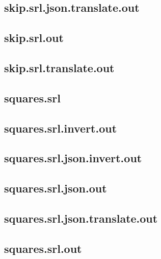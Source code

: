 \subsection{skip.srl.json.translate.out}
\label{app:skip_srl.json.translate.out}

\subsection{skip.srl.out}
\label{app:skip_srl.out}

\subsection{skip.srl.translate.out}
\label{app:skip_srl.translate.out}

\subsection{squares.srl}
\label{app:squares_srl}

\subsection{squares.srl.invert.out}
\label{app:squares_srl.invert.out}

\subsection{squares.srl.json.invert.out}
\label{app:squares_srl.json.invert.out}

\subsection{squares.srl.json.out}
\label{app:squares_srl.json.out}

\subsection{squares.srl.json.translate.out}
\label{app:squares_srl.json.translate.out}

\subsection{squares.srl.out}
\label{app:squares_srl.out}

